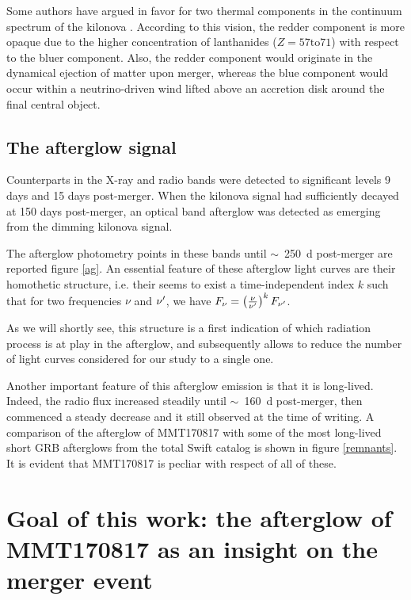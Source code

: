 Some authors have argued in favor for two thermal components in the continuum spectrum of the kilonova \cite{57}. According to this vision, the redder component is more opaque due to the higher concentration of lanthanides ($Z = 57 \text{to} 71$) with respect to the bluer component. Also, the redder component would originate in the dynamical ejection of matter upon merger, whereas the blue component would occur within a neutrino-driven wind lifted above an accretion disk around the final central object.


\subsection{The afterglow signal}
Counterparts in the X-ray and radio bands were detected to significant levels 9 days and 15 days post-merger. When the kilonova signal had sufficiently decayed at 150 days post-merger, an optical band afterglow was detected as emerging from the dimming kilonova signal.

The afterglow photometry points in these bands until $\sim$~250~d post-merger are reported figure \ref{ag}. An essential feature of these afterglow light curves are their homothetic structure, i.e. their seems to exist a time-independent index $k$ such that for two frequencies $\nu$ and $\nu^{\prime}$, we have $F_\nu = \left( \frac{\nu}{\nu^{\prime}} \right)^k F_{\nu^{\prime}}$.


As we will shortly see, this structure is a first indication of which radiation process is at play in the afterglow, and subsequently allows to reduce the number of light curves considered for our study to a single one.


Another important feature of this afterglow emission is that it is long-lived. Indeed, the radio flux increased steadily until $\sim$~160~d post-merger, then commenced a steady decrease and it still observed at the time of writing. A comparison of the afterglow of MMT170817 with some of the most long-lived short GRB afterglows from the total Swift catalog is shown in figure \ref{remnants}. It is evident that MMT170817 is pecliar with respect of all of these.


\section{Goal of this work: the afterglow of MMT170817 as an insight on the merger event}

